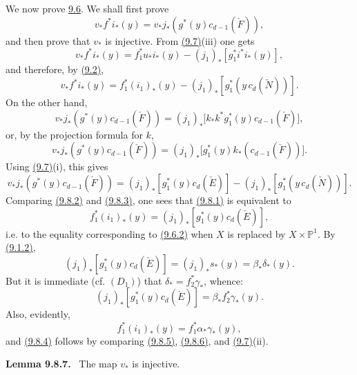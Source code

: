 \documentclass[11pt]{article}
\newenvironment{statement}[1]{\par\medskip\noindent\textbf{#1.}\ }{\par\medskip}
\begin{document}
We now prove \hyperref[sga5:VII:proposition:9.6]{9.6}. We shall first prove
\[
v_*f^*i_*(y)=v_*j_*(g^*(y)c_{d-1}(\check F)),
\tag{9.8.1}\label{sga5:VII:equation:9.8.1}
\]
and then prove that $v_*$ is injective. From \hyperref[sga5:VII:lemma:9.7]{(9.7)}(iii) one gets
\[
v_*f^*i_*(y)=f_1^*u_*i_*(y)-(j_1)_*[g_1^*i^*i_*(y)],
\]
and therefore, by \hyperref[sga5:VII:theorem:9.2]{(9.2)},
\[
v_*f^*i_*(y)=f_1^*(i_1)_*(y)-(j_1)_*[g_1^*(y\,c_d(\check N))].
\tag{9.8.2}\label{sga5:VII:equation:9.8.2}
\]
On the other hand,
\[
v_*j_*(g^*(y)c_{d-1}(\check F))
=(j_1)_*\bigl[k_*k^*g_1^*(y)c_{d-1}(\check F)\bigr],
\]
or, by the projection formula for $k$,
\[
v_*j_*(g^*(y)c_{d-1}(\check F))
=(j_1)_*\bigl[g_1^*(y)k_*(c_{d-1}(\check F))\bigr].
\]
Using \hyperref[sga5:VII:lemma:9.7]{(9.7)}(i), this gives
\[
v_*j_*(g^*(y)c_{d-1}(\check F))
=(j_1)_*[g_1^*(y)c_d(\check E)]-(j_1)_*[g_1^*(y\,c_d(\check N))].
\tag{9.8.3}\label{sga5:VII:equation:9.8.3}
\]
Comparing \hyperref[sga5:VII:equation:9.8.2]{(9.8.2)} and \hyperref[sga5:VII:equation:9.8.3]{(9.8.3)}, one sees that \hyperref[sga5:VII:equation:9.8.1]{(9.8.1)} is equivalent to
\[
f_1^*(i_1)_*(y)=(j_1)_*[g_1^*(y)c_d(\check E)],
\tag{9.8.4}\label{sga5:VII:equation:9.8.4}
\]
i.e. to the equality corresponding to \hyperref[sga5:VII:equation:9.6.2]{(9.6.2)} when $X$ is replaced by $X\times\mathbb P^1$. By \hyperref[sga5:VII:equation:9.1.2]{(9.1.2)},
\[
(j_1)_*[g_1^*(y)c_d(\check E)]=(j_1)_*s_*(y)=\beta_*\delta_*(y).
\]
But it is immediate (cf. $(D_1)$) that $\delta_*=f_2^*\gamma_*$, whence:
\[
(j_1)_*[g_1^*(y)c_d(\check E)]=\beta_*f_2^*\gamma_*(y).
\tag{9.8.5}\label{sga5:VII:equation:9.8.5}
\]
Also, evidently,
\[
f_1^*(i_1)_*(y)=f_1^*\alpha_*\gamma_*(y),
\tag{9.8.6}\label{sga5:VII:equation:9.8.6}
\]
and \hyperref[sga5:VII:equation:9.8.4]{(9.8.4)} follows by comparing \hyperref[sga5:VII:equation:9.8.5]{(9.8.5)}, \hyperref[sga5:VII:equation:9.8.6]{(9.8.6)}, and \hyperref[sga5:VII:lemma:9.7]{(9.7)}(ii).

\label{sga5:VII:lemma:9.8.7}\begin{statement}{Lemma 9.8.7}
The map $v_*$ is injective.
\end{statement}
\end{document}
